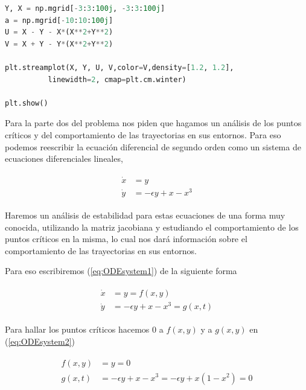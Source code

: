 \documentclass[a4paper,10pt]{article}
\begin{document}
\begin{lstlisting}[language=Python]
Y, X = np.mgrid[-3:3:100j, -3:3:100j]
a = np.mgrid[-10:10:100j]
U = X - Y - X*(X**2+Y**2)
V = X + Y - Y*(X**2+Y**2)

plt.streamplot(X, Y, U, V,color=V,density=[1.2, 1.2], 
	      linewidth=2, cmap=plt.cm.winter)

plt.show()
\end{lstlisting}

Para la parte dos del problema nos piden que hagamos un análisis de los puntos críticos
y del comportamiento de las trayectorias en sus entornos. Para eso podemos reescribir
la ecuación diferencial de segundo orden como un sistema de ecuaciones diferenciales
lineales,


\begin{align}
 \begin{split}
  \dot{x} &= y \\
  \dot{y} &= - \epsilon y + x - x^3
 \end{split}
 \label{eq:ODEsystem1}
\end{align}

Haremos un análisis de estabilidad para estas ecuaciones de una forma muy conocida, utilizando
la matriz jacobiana y estudiando el comportamiento de los puntos críticos en la misma,
lo cual nos dará información sobre el comportamiento de las trayectorias en sus entornos.

\vspace{.3cm}

Para eso escribiremos (\ref{eq:ODEsystem1}) de la siguiente forma

\begin{align}
 \begin{split}
  \dot{x} &= y = f(x,y)\\
  \dot{y} &= - \epsilon y + x - x^3 = g(x,t)
 \end{split}
 \label{eq:ODEsystem2}
\end{align}

Para hallar los puntos críticos hacemos $0$ a $f(x,y)$ y a $g(x,y)$ en (\ref{eq:ODEsystem2})

\begin{align}
 \begin{split}
  f(x,y) &= y = 0\\
  g(x,t) &= -\epsilon y + x - x^3 = -\epsilon y + x(1 - x^2) = 0
 \label{eq:ODEsystem3}
 \end{split}
\end{align}
\end{document}
